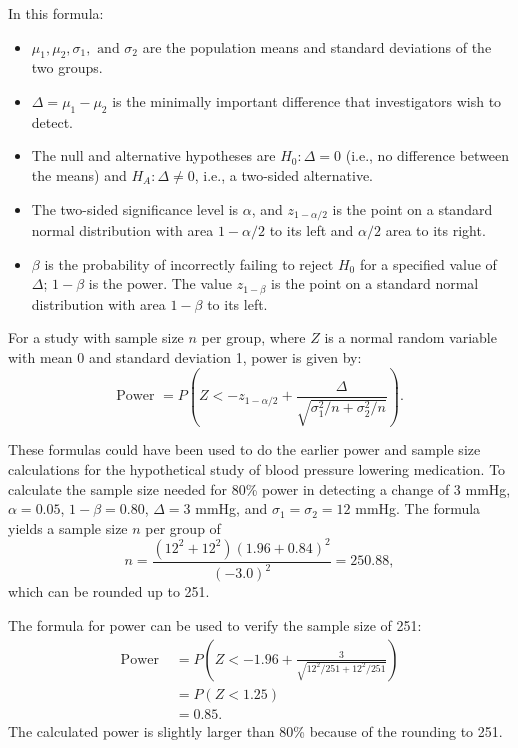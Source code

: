 In this formula: 
\begin{itemize}
\setlength{\itemsep}{0mm}
	
	\item $\mu_1, \mu_2, \sigma_1, \text{ and } \sigma_2$ are the population means and standard deviations of the two groups.
	
	\item $\Delta = \mu_1 - \mu_2$ is the minimally important difference that investigators wish to detect.
	
	\item The null and alternative hypotheses are $H_0: \Delta = 0$ (i.e., no difference between the means) and $H_A: \Delta \neq 0$, i.e., a two-sided alternative.
	
	\item The two-sided significance level is $\alpha$, and $z_{1-\alpha/2}$ is the point on a standard normal distribution with area $1-\alpha/2$ to its left and $\alpha/2$ area to its right.
	
	\item $\beta$ is the probability of incorrectly failing to reject $H_0$ for a specified value of $\Delta$; $1- \beta$ is the power.  The value $z_{1-\beta}$ is the point on a standard normal distribution with area $1 - \beta$ to its left.
	
\end{itemize}


For a study with sample size $n$ per group, where $Z$ is a normal random variable with mean 0 and standard deviation 1, power is given by:
\[
	\text{Power } = P\left(  Z <-z_{1 - \alpha/2} + \frac{\Delta}
	{\sqrt{\sigma_1^2/n + \sigma_2^2/n}}\right).
\]

These formulas could have been used to do the earlier power and sample size calculations for the hypothetical study of blood pressure lowering medication. To calculate the sample size needed for 80\% power in detecting a change of 3 mmHg, $\alpha = 0.05$, $1 - \beta = 0.80$, $\Delta = 3$ mmHg, and $\sigma_1 = \sigma_2 = 12$ mmHg. The formula yields a sample size $n$ per group of 
\[n = \frac{(12^2 + 12^2)(1.96 + 0.84)^2}{(-3.0)^2} = 250.88, \]
which can be rounded up to 251.

The formula for power can be used to verify the sample size of 251:
\begin{align*}
	\text{Power } &= P\left(Z < -1.96 + \frac{3}
	{\sqrt{12^2/251 + 12^2/251}}\right) \\
	&= P(Z < 1.25) \\
	&= 0.85.
\end{align*}
The calculated power is slightly larger than 80\% because of the rounding to 251.

